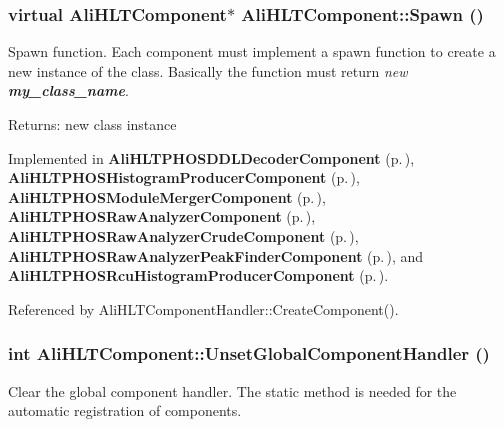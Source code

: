 \subsubsection{\setlength{\rightskip}{0pt plus 5cm}virtual {\bf Ali\-HLTComponent}$\ast$ Ali\-HLTComponent::Spawn ()\hspace{0.3cm}{\tt  [pure virtual]}}\label{classAliHLTComponent_a13}


Spawn function. Each component must implement a spawn function to create a new instance of the class. Basically the function must return {\em new {\bf my\_\-class\_\-name}\/}. \begin{Desc}
\item[Returns:]new class instance \end{Desc}


Implemented in {\bf Ali\-HLTPHOSDDLDecoder\-Component} {\rm (p.\,\pageref{classAliHLTPHOSDDLDecoderComponent_a14})}, {\bf Ali\-HLTPHOSHistogram\-Producer\-Component} {\rm (p.\,\pageref{classAliHLTPHOSHistogramProducerComponent_a15})}, {\bf Ali\-HLTPHOSModule\-Merger\-Component} {\rm (p.\,\pageref{classAliHLTPHOSModuleMergerComponent_a15})}, {\bf Ali\-HLTPHOSRaw\-Analyzer\-Component} {\rm (p.\,\pageref{classAliHLTPHOSRawAnalyzerComponent_a16})}, {\bf Ali\-HLTPHOSRaw\-Analyzer\-Crude\-Component} {\rm (p.\,\pageref{classAliHLTPHOSRawAnalyzerCrudeComponent_a5})}, {\bf Ali\-HLTPHOSRaw\-Analyzer\-Peak\-Finder\-Component} {\rm (p.\,\pageref{classAliHLTPHOSRawAnalyzerPeakFinderComponent_a3})}, and {\bf Ali\-HLTPHOSRcu\-Histogram\-Producer\-Component} {\rm (p.\,\pageref{classAliHLTPHOSRcuHistogramProducerComponent_a9})}.

Referenced by Ali\-HLTComponent\-Handler::Create\-Component().
\subsubsection{\setlength{\rightskip}{0pt plus 5cm}int Ali\-HLTComponent::Unset\-Global\-Component\-Handler ()\hspace{0.3cm}{\tt  [static]}}\label{classAliHLTComponent_e1}


Clear the global component handler. The static method is needed for the automatic registration of components. 

